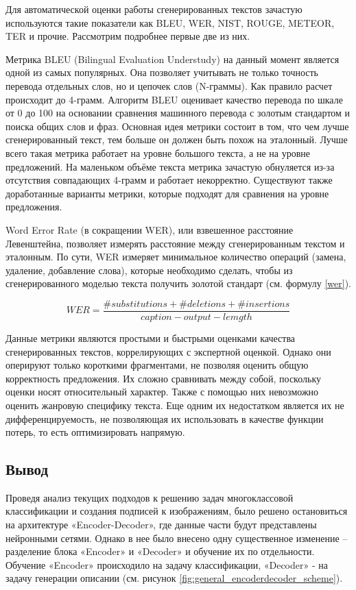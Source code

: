 \documentclass[a4paper,12pt]{extarticle}
\begin{document}
Для автоматической оценки работы сгенерированных текстов зачастую используются такие показатели как BLEU, WER, NIST, ROUGE, METEOR, TER и прочие. Рассмотрим подробнее первые две из них.

Метрика BLEU (Bilingual Evaluation Understudy) на данный момент является одной из самых популярных. Она позволяет учитывать не только точность перевода отдельных слов, но и цепочек слов (N-граммы). Как правило расчет происходит до 4-грамм. Алгоритм BLEU оценивает качество перевода по шкале от 0 до 100 на основании сравнения машинного перевода с золотым стандартом и поиска общих слов и фраз. Основная идея метрики состоит в том, что чем лучше сгенерированный текст, тем больше он должен быть похож на эталонный. Лучше всего такая метрика работает на уровне большого текста, а не на уровне предложений. На маленьком объёме текста метрика зачастую обнуляется из-за отсутствия совпадающих 4-грамм и работает некорректно. Существуют также доработанные варианты метрики, которые подходят для сравнения на уровне предложения.

Word Error Rate (в сокращении WER), или взвешенное расстояние Левенштейна, позволяет измерять расстояние между сгенерированным текстом и эталонным. По сути, WER измеряет минимальное количество операций (замена, удаление, добавление слова), которые необходимо сделать, чтобы из сгенерированного моделью текста получить золотой стандарт (см. формулу \ref{wer}).

\begin{equation}
	\label{wer}	
	WER = \frac{\#substitutions + \#deletions + \#insertions}{caption-output-lemgth}
\end{equation}

Данные метрики являются простыми и быстрыми оценками качества сгенерированных текстов, коррелирующих с экспертной оценкой. Однако они оперируют только короткими фрагментами, не позволяя оценить общую корректность предложения. Их сложно сравнивать между собой, поскольку оценки носят относительный характер. Также с помощью них невозможно оценить жанровую специфику текста. Еще одним их недостатком является их не дифференцируемость, не позволяющая их использовать в качестве функции потерь, то есть оптимизировать напрямую.


\subsection{Вывод}\label{subsection:conclusion}

Проведя анализ текущих подходов к решению задач многоклассовой классификации и создания подписей к изображениям, было решено остановиться на архитектуре «Encoder-Decoder», где данные части будут представлены нейронными сетями. Однако в нее было внесено одну существенное изменение – разделение блока «Encoder» и «Decoder» и обучение их по отдельности. Обучение «Encoder» происходило на задачу классификации, «Decoder» - на задачу генерации описании (см. рисунок \ref{fig:general_encoderdecoder_scheme}).
\end{document}

